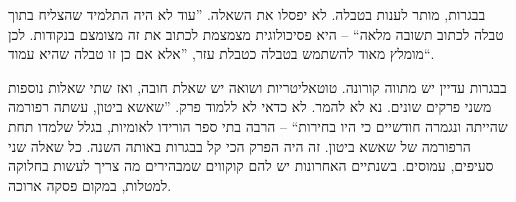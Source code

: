 \documentclass[]{../../../../tex/classes/styledArticle}
\begin{document}
	בבגרות, מותר לענות בטבלה. לא יפסלו את השאלה. ''עוד לא היה התלמיד שהצליח בתוך טבלה לכתוב תשובה מלאה`` – היא פסיכולוגית מצמצמת לכתוב את זה מצומצם בנקודות. לכן מומלץ מאוד להשתמש בטבלה כטבלת עזר, ''אלא אם כן זו טבלה שהיא עמוד``. 
	
	בבגרות עדיין יש מתווה קורונה. טוטאליטריות ושואה יש שאלת חובה, ואז שתי שאלות נוספות משני פרקים שונים. נא לא להמר. לא כדאי לא ללמוד פרק. ''שאשא ביטון, עשתה רפורמה שהייתה ונגמרה חודשיים כי היו בחירות`` – הרבה בתי ספר הורידו לאומיות, בגלל שלמדו תחת הרפורמה של שאשא ביטון. זה היה הפרק הכי קל בבגרות באותה השנה. כל שאלה שני סעיפים, עמוסים. בשנתיים האחרונות יש להם קוקווים שמבהירים מה צריך לעשות בחלוקה למטלות, במקום פסקה ארוכה. 
	
		
	
\end{document}
